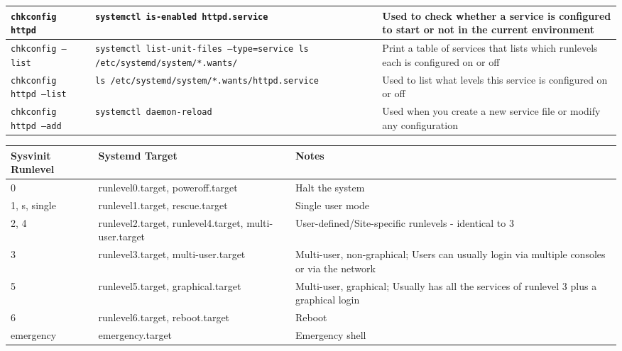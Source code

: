 \documentclass[a4paper]{article}
\begin{document}
\begin{center}
\begin{tabularx}{\textwidth}{ |l|X|X| }
\tt chkconfig httpd           & \tt systemctl is-enabled httpd.service                                                & Used to check whether a service is configured to start or not in the current environment \\\hline
\tt chkconfig --list          & \tt systemctl list-unit-files --type=service \newline ls /etc/systemd/system/*.wants/ & Print a table of services that lists which runlevels each is configured on or off \\\hline
\tt chkconfig httpd --list    & \tt ls /etc/systemd/system/*.wants/httpd.service                                      & Used to list what levels this service is configured on or off \\\hline
\tt chkconfig httpd --add     & \tt systemctl daemon-reload                                                           & Used when you create a new service file or modify any configuration \\\hline
\end{tabularx}

\vspace{6mm}

\begin{tabularx}{\textwidth}{ |l|l|X| }
\hline
\rowcolor[gray]{.8}
\bfseries Sysvinit Runlevel & \bfseries Systemd Target                              & \bfseries Notes \\\hline
0                           & runlevel0.target, poweroff.target                     & Halt the system \\\hline
1, s, single                & runlevel1.target, rescue.target                       & Single user mode \\\hline
2, 4                        & runlevel2.target, runlevel4.target, multi-user.target & User-defined/Site-specific runlevels - identical to 3 \\\hline
3                           & runlevel3.target, multi-user.target                   & Multi-user, non-graphical; Users can usually login via multiple consoles or via the network \\\hline
5                           & runlevel5.target, graphical.target                    & Multi-user, graphical; Usually has all the services of runlevel 3 plus a graphical login \\\hline
6                           & runlevel6.target, reboot.target                       & Reboot \\\hline
emergency                   & emergency.target                                      & Emergency shell \\\hline
\end{tabularx}


\end{center}
\end{document}
